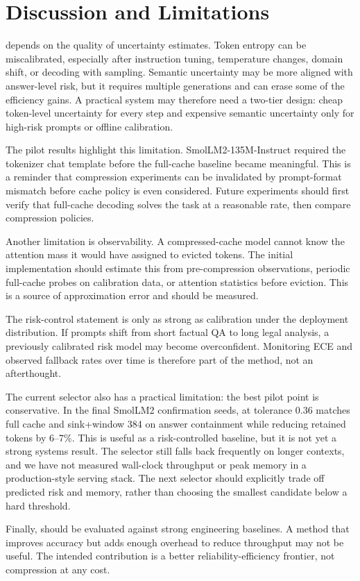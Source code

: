 \section{Discussion and Limitations}

\uckv{} depends on the quality of uncertainty estimates. Token entropy can be miscalibrated, especially after instruction tuning, temperature changes, domain shift, or decoding with sampling. Semantic uncertainty may be more aligned with answer-level risk, but it requires multiple generations and can erase some of the efficiency gains. A practical system may therefore need a two-tier design: cheap token-level uncertainty for every step and expensive semantic uncertainty only for high-risk prompts or offline calibration.

The pilot results highlight this limitation. SmolLM2-135M-Instruct required the tokenizer chat template before the full-cache baseline became meaningful. This is a reminder that compression experiments can be invalidated by prompt-format mismatch before cache policy is even considered. Future experiments should first verify that full-cache decoding solves the task at a reasonable rate, then compare compression policies.

Another limitation is observability. A compressed-cache model cannot know the attention mass it would have assigned to evicted tokens. The initial implementation should estimate this from pre-compression observations, periodic full-cache probes on calibration data, or attention statistics before eviction. This is a source of approximation error and should be measured.

The risk-control statement is only as strong as calibration under the deployment distribution. If prompts shift from short factual QA to long legal analysis, a previously calibrated risk model may become overconfident. Monitoring ECE and observed fallback rates over time is therefore part of the method, not an afterthought.

The current selector also has a practical limitation: the best pilot point is conservative. In the final SmolLM2 confirmation seeds, \uckv{} at tolerance 0.36 matches full cache and sink+window 384 on answer containment while reducing retained tokens by 6--7\%. This is useful as a risk-controlled baseline, but it is not yet a strong systems result. The selector still falls back frequently on longer contexts, and we have not measured wall-clock throughput or peak memory in a production-style serving stack. The next selector should explicitly trade off predicted risk and memory, rather than choosing the smallest candidate below a hard threshold.

Finally, \uckv{} should be evaluated against strong engineering baselines. A method that improves accuracy but adds enough overhead to reduce throughput may not be useful. The intended contribution is a better reliability-efficiency frontier, not compression at any cost.
